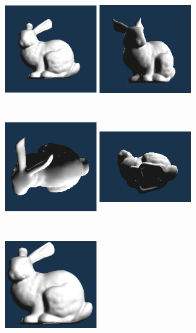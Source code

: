 \documentclass[acmtog]{acmart}
\begin{document}
\begin{figure}[h]
	\centering
	\includegraphics[width=4cm,height=5cm]{1}
	\includegraphics[width=4cm,height=5cm]{2}
	\includegraphics[width=4cm,height=5cm]{3}
	\includegraphics[width=4cm,height=5cm]{4}
	\includegraphics[width=4cm,height=5cm]{5}

\end{figure}
\end{document}
